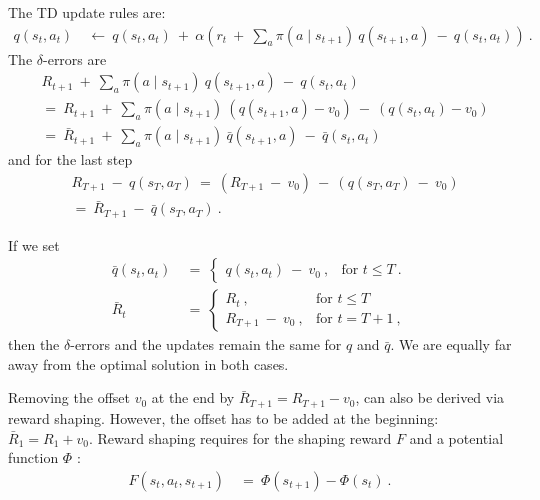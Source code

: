 \documentclass{article}
\renewcommand{\leq}{\leqslant}
\begin{document}
\begin{appendices}
The TD update rules are:
\begin{align}
  q(s_t,a_t) \ &\longleftarrow \ q(s_t,a_t) \ + \ \alpha \left(r_t \ +
    \ \sum_{a} \pi(a \mid s_{t+1}) \
    q(s_{t+1},a) \ - \ q(s_t,a_t) \right) \ .
\end{align}
The $\delta$-errors are
\begin{align}\nonumber
  &R_{t+1} \ + \ \sum_{a} \pi(a \mid s_{t+1}) \
    q(s_{t+1},a) \ - \ q(s_t,a_t)  \\ \nonumber
   &= \ R_{t+1} \ + \ \sum_{a} \pi(a \mid s_{t+1}) \
    (q(s_{t+1},a)-v_0) \ - \ (q(s_t,a_t) -v_0) \\
  &= \
  \bar{R}_{t+1} \ + \ \sum_{a} \pi(a \mid s_{t+1}) \
    \bar{q}(s_{t+1},a) \ - \ \bar{q}(s_t,a_t)
\end{align}
and for the last step
\begin{align}
  &R_{T+1} \ - \ q(s_T,a_T)  \ = \
  (R_{T+1} \ - \ v_0) \ - \ ( q(s_T,a_T) \ - \ v_0) \\\nonumber
  &= \ \bar{R}_{T+1}   \ - \ \bar{q}(s_T,a_T) \ .
\end{align}

If we set 
\begin{align}
  \bar{q}(s_t,a_t) \ &= \
  \begin{cases}
    q(s_t,a_t) \ - \ v_0 \ , & \text{for } t \leq T  \ .
  \end{cases}  \\
  \bar{R}_t \ &= \
  \begin{cases}
    R_t \ , & \text{for } t \leq T  \\
    R_{T+1} \ - \ v_0 \ , & \text{for } t = T+1  \ ,
  \end{cases}
\end{align}
then the $\delta$-errors and the updates remain the same for $q$ and $\bar{q}$.
We are equally far away from the optimal solution in both cases.





Removing the offset $v_0$ at the end by $\bar{R}_{T+1}=R_{T+1}-v_0$,
can also be derived via reward shaping.
However, the offset has to be added at the beginning: $\bar{R}_1=R_1+v_0$.
Reward shaping requires for the shaping reward $F$ and a potential
function $\Phi$ \cite{Ng:99,Wiewiora:03}:
\begin{align}
F(s_t,a_t,s_{t+1}) \ &= \ \Phi(s_{t+1}) - \Phi(s_t) \ .
\end{align}


\end{appendices}
\end{document}
